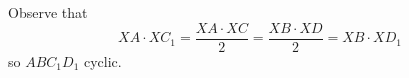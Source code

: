 Observe that \[XA\cdot XC_1=\frac{XA\cdot XC}{2}=\frac{XB\cdot XD}{2}=XB\cdot XD_1\] so $ABC_1D_1$ cyclic.